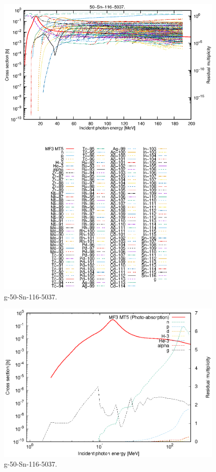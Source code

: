 \begin{figure}
 \includegraphics[width=\linewidth]{eps/g_50-Sn-116_5037.eps}
  \caption{g-50-Sn-116-5037.}
\end{figure}
\newpage \clearpage

\begin{figure}
 \includegraphics[width=\linewidth]{eps-log/g_50-Sn-116_5037.eps}
 \caption{g-50-Sn-116-5037.}
\end{figure}
\newpage \clearpage

